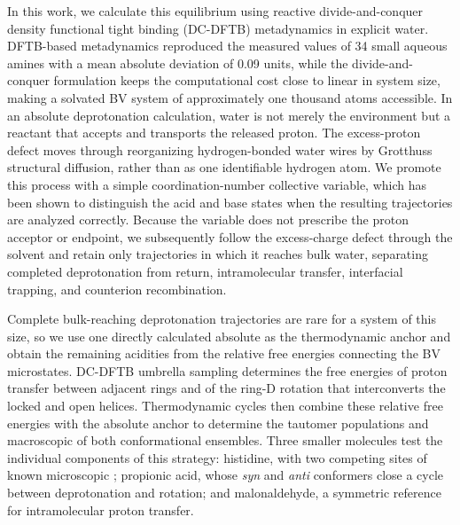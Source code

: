 In this work, we calculate this equilibrium using reactive divide-and-conquer density functional tight binding (DC-DFTB) metadynamics in explicit water.\cite{barducciMetadynamics2011,nishizawaThreePillarsAchieving2016,nakaiDivideandConquerTypeDensityFunctionalTightBinding2016,nishimuraHierarchicalParallelizationDivideandconquer2020} DFTB-based metadynamics reproduced the measured \pka{} values of 34 small aqueous amines with a mean absolute deviation of 0.09 units,\cite{Sakti2018} while the divide-and-conquer formulation keeps the computational cost close to linear in system size, making a solvated BV system of approximately one thousand atoms accessible.\cite{nishizawaThreePillarsAchieving2016,nakaiDivideandConquerTypeDensityFunctionalTightBinding2016} In an absolute deprotonation calculation, water is not merely the environment but a reactant that accepts and transports the released proton. The excess-proton defect moves through reorganizing hydrogen-bonded water wires by Grotthuss structural diffusion, rather than as one identifiable hydrogen atom.\cite{agmonGrotthussMechanism1995,agmonProtonsHydroxideIons2016,cukiermanTuGrotthussOther2006,hassanaliProtonTransferWater2013,miyakeGrotthussMechanismsProton2016,popovSearchGrotthussMechanism2023} We promote this process with a simple coordination-number collective variable, which has been shown to distinguish the acid and base states when the resulting trajectories are analyzed correctly.\cite{Tummanapelli2015Polyprotic,Tummanapelli2015Amino,Sakti2018} Because the variable does not prescribe the proton acceptor or endpoint, we subsequently follow the excess-charge defect through the solvent and retain only trajectories in which it reaches bulk water, separating completed deprotonation from return, intramolecular transfer, interfacial trapping, and counterion recombination.

Complete bulk-reaching deprotonation trajectories are rare for a system of this size, so we use one directly calculated absolute \pka{} as the thermodynamic anchor and obtain the remaining acidities from the relative free energies connecting the BV microstates. DC-DFTB umbrella sampling determines the free energies of proton transfer between adjacent rings and of the ring-D rotation that interconverts the locked and open helices. Thermodynamic cycles then combine these relative free energies with the absolute anchor to determine the tautomer populations and macroscopic \pka{} of both conformational ensembles. Three smaller molecules test the individual components of this strategy: histidine, with two competing sites of known microscopic \pka{};\cite{kyte_structure_2006,tanokura1HNMRStudyTautomerism1983} propionic acid, whose \emph{syn} and \emph{anti} conformers close a cycle between deprotonation and rotation;\cite{macoas_internal_2005} and malonaldehyde, a symmetric reference for intramolecular proton transfer.\cite{baughcumMicrowaveSpectroscopicStudy1981,wangFulldimensionalQuantumCalculations2008}
